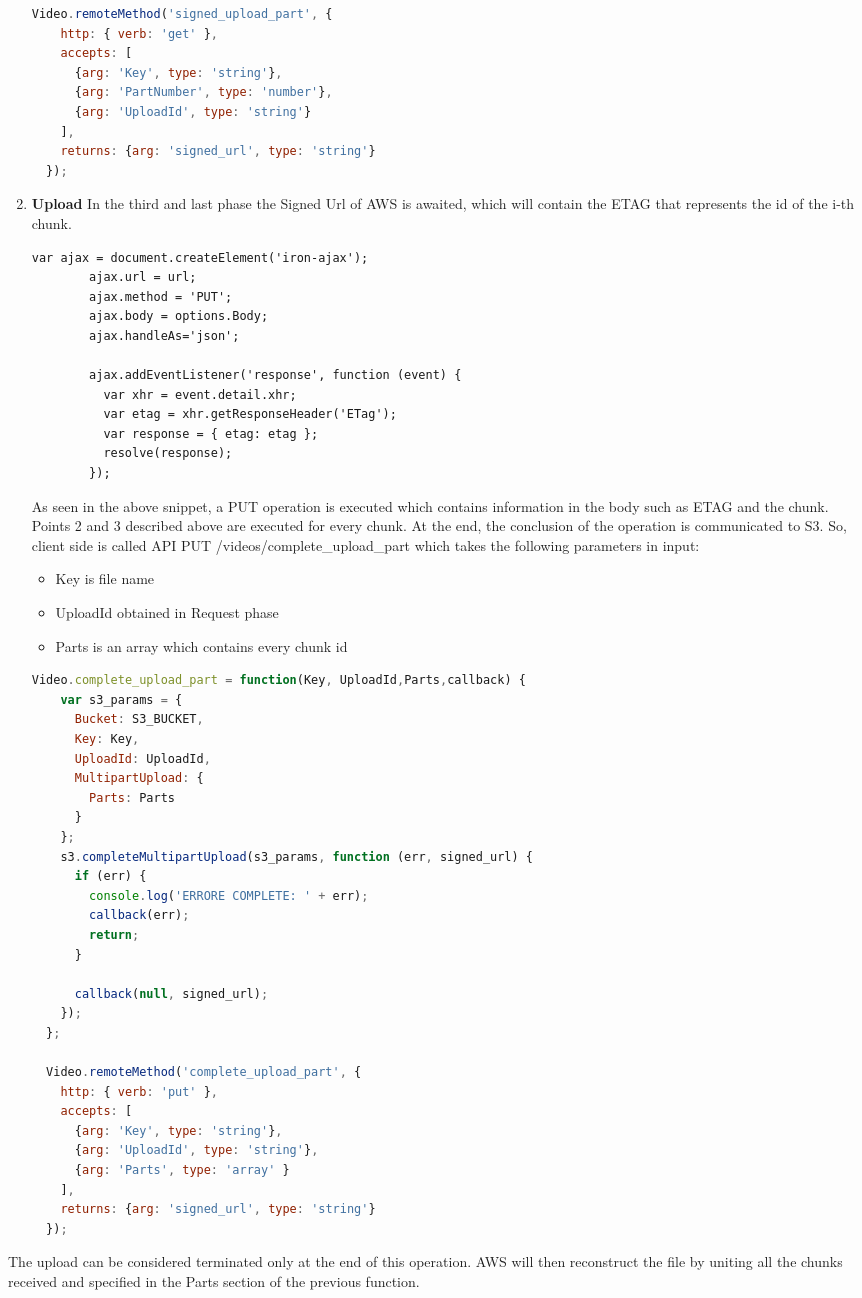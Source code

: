 \begin{enumerate}
\begin{lstlisting}[language=javascript]
  Video.remoteMethod('signed_upload_part', {
    http: { verb: 'get' },
    accepts: [
      {arg: 'Key', type: 'string'},
      {arg: 'PartNumber', type: 'number'},
      {arg: 'UploadId', type: 'string'}
    ],
    returns: {arg: 'signed_url', type: 'string'}
  });
\end{lstlisting}

\item \textbf{Upload}
In the third and last phase the Signed Url of AWS is awaited, which will contain the ETAG that represents the id of the i-th chunk.

\begin{lstlisting}[language=html]
var ajax = document.createElement('iron-ajax');
        ajax.url = url;
        ajax.method = 'PUT';
        ajax.body = options.Body;
        ajax.handleAs='json';

        ajax.addEventListener('response', function (event) {
          var xhr = event.detail.xhr;
          var etag = xhr.getResponseHeader('ETag');
          var response = { etag: etag };
          resolve(response);
        });
\end{lstlisting}

As seen in the above snippet, a PUT operation is executed which contains information in the body such as ETAG and the chunk.
Points 2 and 3 described above are executed for every chunk. At the end, the conclusion of the operation is communicated to S3. 
So, client side is called API PUT /videos/complete\_upload\_part which takes the following parameters in input:
  \begin{itemize}
      \item Key is file name
      \item UploadId obtained in Request phase
      \item Parts is an array which contains every chunk id

  \end{itemize}

\begin{lstlisting}[language=javascript]
Video.complete_upload_part = function(Key, UploadId,Parts,callback) {
    var s3_params = {
      Bucket: S3_BUCKET,
      Key: Key,
      UploadId: UploadId,
      MultipartUpload: {
        Parts: Parts
      } 
    };
    s3.completeMultipartUpload(s3_params, function (err, signed_url) {
      if (err) {
        console.log('ERRORE COMPLETE: ' + err);
        callback(err);
        return;
      }

      callback(null, signed_url);
    });
  };

  Video.remoteMethod('complete_upload_part', {
    http: { verb: 'put' },
    accepts: [
      {arg: 'Key', type: 'string'},
      {arg: 'UploadId', type: 'string'},
      {arg: 'Parts', type: 'array' }
    ],
    returns: {arg: 'signed_url', type: 'string'}
  });

\end{lstlisting}

\end{enumerate}
The upload can be considered terminated only at the end of this operation. AWS will then reconstruct the file by uniting all the chunks received and specified in the Parts section of the previous function.
